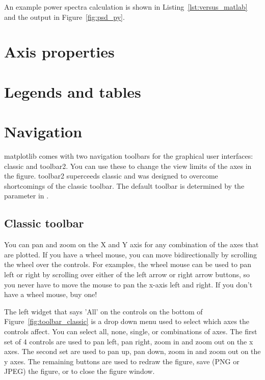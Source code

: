 \documentclass[]{book}
\begin{document}
\noindent An example power spectra calculation is shown in
Listing~\ref{lst:versus_matlab} and the output in
Figure~\ref{fig:psd_py}.


\section{Axis properties}
\label{sec:axis_props}

\section{Legends and tables}
\label{sec:legends_and_tables}


\section{Navigation}
\label{sec:navigation}

matplotlib comes with two navigation toolbars for the graphical user
interfaces: classic and toolbar2.  You can use these to change the
view limits of the axes in the figure.  toolbar2 superceeds classic
and was designed to overcome shortcomings of the classic toolbar.  The
default toolbar is determined by the  parameter in
.

\subsection{Classic toolbar}
\label{sec:toolbar_classic}

You can pan and zoom on the X and Y axis for any combination of the
axes that are plotted.  If you have a wheel mouse, you can move
bidirectionally by scrolling the wheel over the controls.  For
examples, the wheel mouse can be used to pan left or right by
scrolling over either of the left arrow or right arrow buttons, so you
never have to move the mouse to pan the x-axis left and right.  If you
don't have a wheel mouse, buy one!

The left widget that says 'All' on the controls on the bottom of
Figure~\ref{fig:toolbar_classic} is a drop down menu used to select
which axes the controls affect.  You can select all, none, single, or
combinations of axes.  The first set of 4 controls are used to pan
left, pan right, zoom in and zoom out on the x axes.  The second set
are used to pan up, pan down, zoom in and zoom out on the y axes.  The
remaining buttons are used to redraw the figure, save (PNG or JPEG)
the figure, or to close the figure window.
\end{document}
